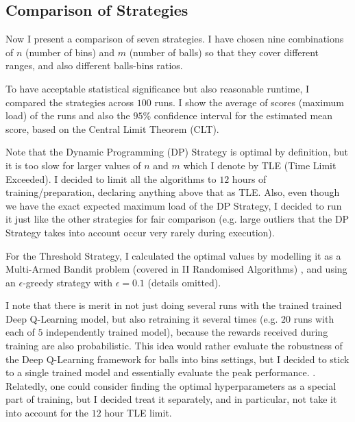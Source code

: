\subsection{Comparison of Strategies}

Now I present a comparison of seven \TwoThinning strategies. I have chosen nine combinations of $n$ (number of bins) and $m$ (number of balls) so that they cover different ranges, and also different balls-bins ratios.


To have acceptable statistical significance but also reasonable runtime, I compared the strategies across $100$ runs. I show the average of scores (maximum load) of the runs and also the $95\%$ confidence interval for the estimated mean score, based on the Central Limit Theorem (CLT). 


Note that the Dynamic Programming (DP) Strategy is optimal by definition, but it is too slow for larger values of $n$ and $m$ which I denote by TLE (Time Limit Exceeded). I decided to limit all the algorithms to $12$ hours of training/preparation, declaring anything above that as TLE. Also, even though we have the exact expected maximum load of the DP Strategy, I decided to run it just like the other strategies for fair comparison (e.g. large outliers that the DP Strategy takes into account occur very rarely during execution).


For the Threshold Strategy, I calculated the optimal values by modelling it as a Multi-Armed Bandit problem (covered in II Randomised Algorithms) \cite{katehakis1987multiarmedbandit}, and using an $\epsilon$-greedy strategy with $\epsilon=0.1$ (details omitted).


I note that there is merit in not just doing several runs with the trained trained Deep Q-Learning model, but also retraining it several times (e.g. $20$ runs with each of $5$ independently trained model), because the rewards received during training are also probabilistic. This idea would rather evaluate the robustness of the Deep Q-Learning framework for balls into bins settings, but I decided to stick to a single trained model and essentially evaluate the peak performance. . Relatedly, one could consider finding the optimal hyperparameters as a special part of training, but I decided treat it separately, and in particular, not take it into account for the $12$ hour TLE limit.


